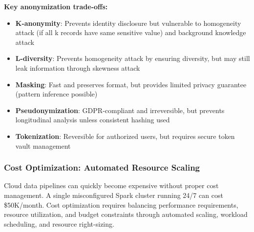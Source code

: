 \textbf{Key anonymization trade-offs:}

\begin{itemize}
    \item \textbf{K-anonymity}: Prevents identity disclosure but vulnerable to homogeneity attack (if all k records have same sensitive value) and background knowledge attack
    \item \textbf{L-diversity}: Prevents homogeneity attack by ensuring diversity, but may still leak information through skewness attack
    \item \textbf{Masking}: Fast and preserves format, but provides limited privacy guarantee (pattern inference possible)
    \item \textbf{Pseudonymization}: GDPR-compliant and irreversible, but prevents longitudinal analysis unless consistent hashing used
    \item \textbf{Tokenization}: Reversible for authorized users, but requires secure token vault management
\end{itemize}

\subsubsection{Cost Optimization: Automated Resource Scaling}

Cloud data pipelines can quickly become expensive without proper cost management. A single misconfigured Spark cluster running 24/7 can cost \$50K/month. Cost optimization requires balancing performance requirements, resource utilization, and budget constraints through automated scaling, workload scheduling, and resource right-sizing.

